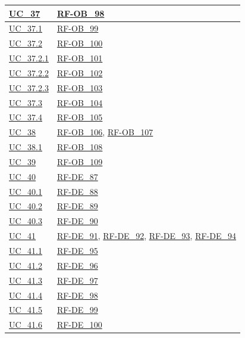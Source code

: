 \begin{longtable}{|
        >{\raggedright\arraybackslash}p{} |
        >{\raggedright\arraybackslash}p{} |
    }
    \hline
    \hyperref[uc_37]{UC\_37} & \hyperlink{rf-ob_98}{RF-OB\_98} \\
    \hline
    \hyperref[uc_37.1]{UC\_37.1} & \hyperlink{rf-ob_99}{RF-OB\_99} \\
    \hline
    \hyperref[uc_37.2]{UC\_37.2} & \hyperlink{rf-ob_100}{RF-OB\_100} \\
    \hline
    \hyperref[uc_37.2.1]{UC\_37.2.1} & \hyperlink{rf-ob_101}{RF-OB\_101} \\
    \hline
    \hyperref[uc_37.2.2]{UC\_37.2.2} & \hyperlink{rf-ob_102}{RF-OB\_102} \\
    \hline
    \hyperref[uc_37.2.3]{UC\_37.2.3} & \hyperlink{rf-ob_103}{RF-OB\_103} \\
    \hline
    \hyperref[uc_37.3]{UC\_37.3} & \hyperlink{rf-ob_104}{RF-OB\_104} \\
    \hline
    \hyperref[uc_37.4]{UC\_37.4} & \hyperlink{rf-ob_105}{RF-OB\_105} \\
    \hline

    \hyperref[uc_38]{UC\_38} & \hyperlink{rf-ob_106}{RF-OB\_106}, \hyperlink{rf-ob_107}{RF-OB\_107} \\
    \hline
    \hyperref[uc_38.1]{UC\_38.1} & \hyperlink{rf-ob_108}{RF-OB\_108} \\
    \hline

    \hyperref[uc_39]{UC\_39} & \hyperlink{rf-ob_109}{RF-OB\_109} \\
    \hline

    \hyperref[uc_40]{UC\_40} & \hyperlink{rf-de_87}{RF-DE\_87} \\
    \hline
    \hyperref[uc_40.1]{UC\_40.1} & \hyperlink{rf-de_88}{RF-DE\_88} \\
    \hline
    \hyperref[uc_40.2]{UC\_40.2} & \hyperlink{rf-de_89}{RF-DE\_89} \\
    \hline
    \hyperref[uc_40.3]{UC\_40.3} & \hyperlink{rf-de_90}{RF-DE\_90} \\
    \hline

    \hyperref[uc_41]{UC\_41} & \hyperlink{rf-de_91}{RF-DE\_91}, \hyperlink{rf-de_92}{RF-DE\_92}, \hyperlink{rf-de_93}{RF-DE\_93}, \hyperlink{rf-de_94}{RF-DE\_94} \\
    \hline
    \hyperref[uc_41.1]{UC\_41.1} & \hyperlink{rf-de_95}{RF-DE\_95} \\
    \hline
    \hyperref[uc_41.2]{UC\_41.2} & \hyperlink{rf-de_96}{RF-DE\_96} \\
    \hline
    \hyperref[uc_41.3]{UC\_41.3} & \hyperlink{rf-de_97}{RF-DE\_97} \\
    \hline
    \hyperref[uc_41.4]{UC\_41.4} & \hyperlink{rf-de_98}{RF-DE\_98} \\
    \hline
    \hyperref[uc_41.5]{UC\_41.5} & \hyperlink{rf-de_99}{RF-DE\_99} \\
    \hline
    \hyperref[uc_41.6]{UC\_41.6} & \hyperlink{rf-de_100}{RF-DE\_100} \\
    \hline


\end{longtable}
